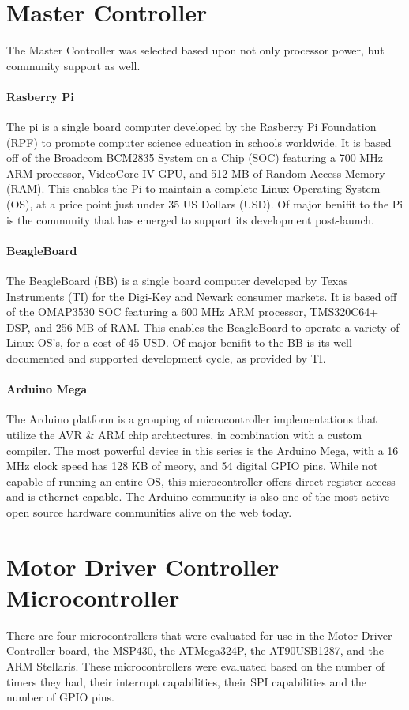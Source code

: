 \section{Master Controller}
The Master Controller  was selected based upon not only processor power, but community support as well. 

\paragraph{Rasberry Pi}
The \gls{pi} is a single board computer developed by the Rasberry Pi Foundation (RPF) to promote computer science education in schools worldwide.
It is based off of the Broadcom BCM2835 System on a Chip (SOC) featuring a 700 MHz ARM processor, VideoCore IV GPU, and 512 MB of Random Access Memory (RAM).
This enables the Pi to maintain a complete Linux Operating System (OS), at a price point just under 35 US Dollars (USD).
Of major beniﬁt to the Pi is the community that has emerged to support its development post-launch.

\paragraph{BeagleBoard}
The BeagleBoard (BB) is a single board computer developed by Texas Instruments (TI) for the Digi-Key and Newark consumer markets.
It is based off of the OMAP3530 SOC featuring a 600 MHz ARM processor, TMS320C64+ DSP, and 256 MB of RAM.
This enables the BeagleBoard to operate a variety of Linux OS’s, for a cost of 45 USD.
Of major beniﬁt to the BB is its well documented and supported development cycle, as provided by TI.

\paragraph{Arduino Mega}
The Arduino platform is a grouping of microcontroller implementations that utilize the AVR \& ARM chip archtectures, in combination with a custom compiler.
The most powerful device in this series is the Arduino Mega, with a 16 MHz clock speed has 128 KB of meory, and 54 digital GPIO pins.
While not capable of running an entire OS, this microcontroller offers direct register access and is ethernet capable.
The Arduino community is also one of the most active open source hardware communities alive on the web today.


\section{Motor Driver Controller Microcontroller}
There are four microcontrollers that were evaluated for use in the Motor Driver Controller board, the MSP430, the ATMega324P, the AT90USB1287, and the ARM Stellaris.
These microcontrollers were evaluated based on the number of timers they had, their interrupt capabilities, their SPI capabilities and the number of GPIO pins.

